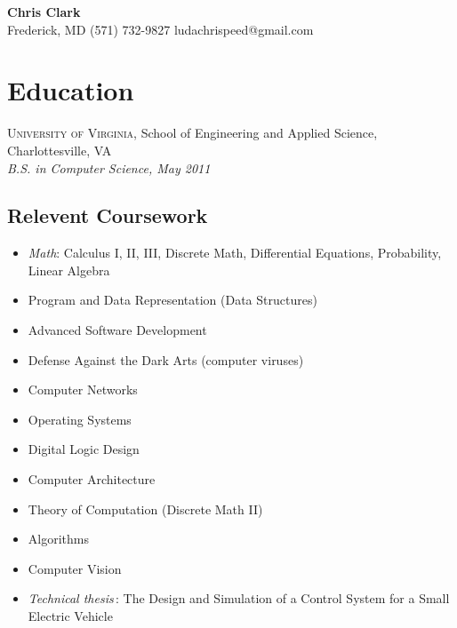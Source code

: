 \documentclass[a4paper,11pt]{article}
\begin{document}
\begin{center}
  {\sffamily \huge \textbf{Chris Clark}} \\ 
  Frederick, MD \enspace\textopenbullet\enspace
  (571) 732-9827 \enspace\textopenbullet\enspace
  ludachrispeed@gmail.com
\end{center}


\vspace{-8pt}
\section*{Education}

  \textsc{University of Virginia}, School of Engineering and Applied Science,
  Charlottesville, VA \\
  \textit{B.S. in Computer Science, May 2011}

%

  \subsection*{Relevent Coursework}

  \begin{multicols}{2} 
    \raggedright

    \begin{itemize}
    \item \textit{Math}: Calculus I, II, III, Discrete Math, Differential
      Equations, Probability, Linear Algebra
    \item Program and Data Representation (Data Structures)
    \item Advanced Software Development
    \item Defense Against the Dark Arts (computer viruses)
    \item Computer Networks
    \item Operating Systems
    \item Digital Logic Design
    \item Computer Architecture
    \item Theory of Computation (Discrete Math II)
    \item Algorithms
    \item Computer Vision
    \item \textsl{Technical thesis\,}: The Design and Simulation of a Control
      System for a Small Electric Vehicle
    \end{itemize}
  \end{multicols}
\end{document}
